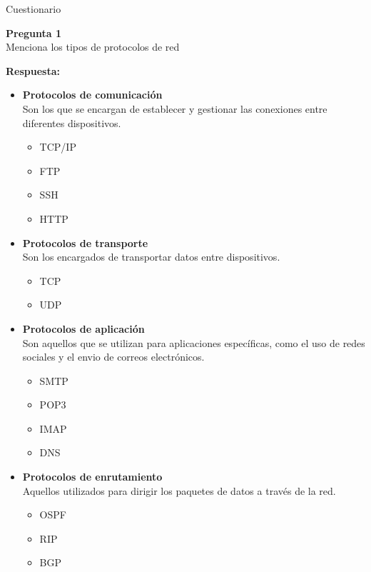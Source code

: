 \documentclass{article}
\newenvironment{problem}[2][Pregunta]
    { \begin{mdframed}[backgroundcolor=gray!20] \textbf{#1 #2} \\}
    {  \end{mdframed}}
\newenvironment{solution}
    {\textbf{Respuesta:\\}}
    {}
\begin{document}
\begin{section}{Cuestionario}  

\begin{problem}
    {1} Menciona los tipos de protocolos de red
\end{problem}

\begin{solution}
    \begin{itemize}
        \item \textbf{Protocolos de comunicación} \\
        Son los que se encargan de establecer y gestionar las conexiones entre diferentes dispositivos.
        \begin{itemize}
            \item TCP/IP
            \item FTP
            \item SSH
            \item HTTP
        \end{itemize}

        \item \textbf{Protocolos de transporte}\\
        Son los encargados de transportar datos entre dispositivos.
        \begin{itemize}
            \item TCP
            \item UDP
        \end{itemize}

        \item \textbf{Protocolos de aplicación}\\
        Son aquellos que se utilizan para aplicaciones específicas, como el uso de redes sociales y el envio de correos electrónicos.
        \begin{itemize}
            \item SMTP
            \item POP3
            \item IMAP
            \item DNS
        \end{itemize}

        \item \textbf{Protocolos de enrutamiento}\\
        Aquellos utilizados para dirigir los paquetes de datos a través de la red.
        \begin{itemize}
            \item OSPF
            \item RIP
            \item BGP
        \end{itemize}


\end{itemize}
\end{solution}
\end{section}
\end{document}

